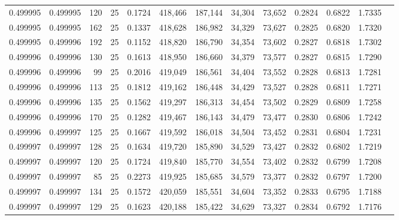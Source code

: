 \begin{tabular}{rrrrrrrrrrrrr}
0.499995 & 0.499995 &   120 &  25 &                                     0.1724 & 418,466 & 187,144 &  34,304 &  73,652 & 0.2824 & 0.6822 & 1.7335 \\
0.499995 & 0.499995 &   162 &  25 &                                     0.1337 & 418,628 & 186,982 &  34,329 &  73,627 & 0.2825 & 0.6820 & 1.7320 \\
0.499995 & 0.499996 &   192 &  25 &                                     0.1152 & 418,820 & 186,790 &  34,354 &  73,602 & 0.2827 & 0.6818 & 1.7302 \\
0.499996 & 0.499996 &   130 &  25 &                                     0.1613 & 418,950 & 186,660 &  34,379 &  73,577 & 0.2827 & 0.6815 & 1.7290 \\
0.499996 & 0.499996 &    99 &  25 &                                     0.2016 & 419,049 & 186,561 &  34,404 &  73,552 & 0.2828 & 0.6813 & 1.7281 \\
0.499996 & 0.499996 &   113 &  25 &                                     0.1812 & 419,162 & 186,448 &  34,429 &  73,527 & 0.2828 & 0.6811 & 1.7271 \\
0.499996 & 0.499996 &   135 &  25 &                                     0.1562 & 419,297 & 186,313 &  34,454 &  73,502 & 0.2829 & 0.6809 & 1.7258 \\
0.499996 & 0.499996 &   170 &  25 &                                     0.1282 & 419,467 & 186,143 &  34,479 &  73,477 & 0.2830 & 0.6806 & 1.7242 \\
0.499996 & 0.499997 &   125 &  25 &                                     0.1667 & 419,592 & 186,018 &  34,504 &  73,452 & 0.2831 & 0.6804 & 1.7231 \\
0.499997 & 0.499997 &   128 &  25 &                                     0.1634 & 419,720 & 185,890 &  34,529 &  73,427 & 0.2832 & 0.6802 & 1.7219 \\
0.499997 & 0.499997 &   120 &  25 &                                     0.1724 & 419,840 & 185,770 &  34,554 &  73,402 & 0.2832 & 0.6799 & 1.7208 \\
0.499997 & 0.499997 &    85 &  25 &                                     0.2273 & 419,925 & 185,685 &  34,579 &  73,377 & 0.2832 & 0.6797 & 1.7200 \\
0.499997 & 0.499997 &   134 &  25 &                                     0.1572 & 420,059 & 185,551 &  34,604 &  73,352 & 0.2833 & 0.6795 & 1.7188 \\
0.499997 & 0.499997 &   129 &  25 &                                     0.1623 & 420,188 & 185,422 &  34,629 &  73,327 & 0.2834 & 0.6792 & 1.7176 \\

\end{tabular}
